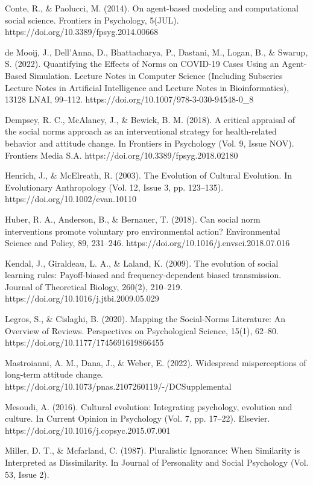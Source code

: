 \documentclass{article}
\begin{document}
Conte, R., & Paolucci, M. (2014). On agent-based modeling and computational social science. Frontiers in Psychology, 5(JUL). https://doi.org/10.3389/fpsyg.2014.00668

de Mooij, J., Dell’Anna, D., Bhattacharya, P., Dastani, M., Logan, B., & Swarup, S. (2022). Quantifying the Effects of Norms on COVID-19 Cases Using an Agent-Based Simulation. Lecture Notes in Computer Science (Including Subseries Lecture Notes in Artificial Intelligence and Lecture Notes in Bioinformatics), 13128 LNAI, 99–112. https://doi.org/10.1007/978-3-030-94548-0_8

Dempsey, R. C., McAlaney, J., & Bewick, B. M. (2018). A critical appraisal of the social norms approach as an interventional strategy for health-related behavior and attitude change. In Frontiers in Psychology (Vol. 9, Issue NOV). Frontiers Media S.A. https://doi.org/10.3389/fpsyg.2018.02180

Henrich, J., & McElreath, R. (2003). The Evolution of Cultural Evolution. In Evolutionary Anthropology (Vol. 12, Issue 3, pp. 123–135). https://doi.org/10.1002/evan.10110

Huber, R. A., Anderson, B., & Bernauer, T. (2018). Can social norm interventions promote voluntary pro environmental action? Environmental Science and Policy, 89, 231–246. https://doi.org/10.1016/j.envsci.2018.07.016

Kendal, J., Giraldeau, L. A., & Laland, K. (2009). The evolution of social learning rules: Payoff-biased and frequency-dependent biased transmission. Journal of Theoretical Biology, 260(2), 210–219. https://doi.org/10.1016/j.jtbi.2009.05.029

Legros, S., & Cislaghi, B. (2020). Mapping the Social-Norms Literature: An Overview of Reviews. Perspectives on Psychological Science, 15(1), 62–80. https://doi.org/10.1177/1745691619866455

Mastroianni, A. M., Dana, J., & Weber, E. (2022). Widespread misperceptions of long-term attitude change. https://doi.org/10.1073/pnas.2107260119/-/DCSupplemental

Mesoudi, A. (2016). Cultural evolution: Integrating psychology, evolution and culture. In Current Opinion in Psychology (Vol. 7, pp. 17–22). Elsevier. https://doi.org/10.1016/j.copsyc.2015.07.001

Miller, D. T., & Mcfarland, C. (1987). Pluralistic Ignorance: When Similarity is Interpreted as Dissimilarity. In Journal of Personality and Social Psychology (Vol. 53, Issue 2).
\end{document}
